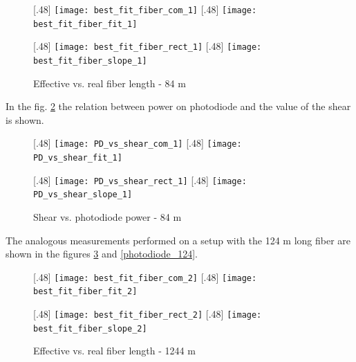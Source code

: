 \documentclass{article}
\begin{document}
\begin{figure}[H]

\caption{Effective vs. real fiber length - 84 m}
[.48\linewidth]{%
\texttt{[image: best\_fit\_fiber\_com\_1]}%
}%
\hfill
{}[.48\linewidth]{%
\texttt{[image: best\_fit\_fiber\_fit\_1]}%
}

\vfill

[.48\linewidth]{%
\texttt{[image: best\_fit\_fiber\_rect\_1]}%
}%
\hfill
{}[.48\linewidth]{%
\texttt{[image: best\_fit\_fiber\_slope\_1]}%
}
\label{fiber_84}
\end{figure}

In the fig. \ref{photodiode_84} the relation between power on photodiode and the value of the shear is shown.

\begin{figure}[H]

\caption{Shear vs. photodiode power - 84 m}
[.48\linewidth]{%
\texttt{[image: PD\_vs\_shear\_com\_1]}%
}%
\hfill
{}[.48\linewidth]{%
\texttt{[image: PD\_vs\_shear\_fit\_1]}%
}

\vfill

[.48\linewidth]{%
\texttt{[image: PD\_vs\_shear\_rect\_1]}%
}%
\hfill
{}[.48\linewidth]{%
\texttt{[image: PD\_vs\_shear\_slope\_1]}%
}
\label{photodiode_84}
\end{figure}

The analogous measurements performed on a setup with the 124 m long fiber are shown in the figures \ref{fiber_124} and \ref{photodiode_124}.
 
\begin{figure}[H]

\caption{Effective vs. real fiber length - 1244 m}
[.48\linewidth]{%
\texttt{[image: best\_fit\_fiber\_com\_2]}%
}%
\hfill
{}[.48\linewidth]{%
\texttt{[image: best\_fit\_fiber\_fit\_2]}%
}

\vfill

[.48\linewidth]{%
\texttt{[image: best\_fit\_fiber\_rect\_2]}%
}%
\hfill
{}[.48\linewidth]{%
\texttt{[image: best\_fit\_fiber\_slope\_2]}%
}
\label{fiber_124}
\end{figure}
 
\end{document}
